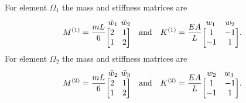 \documentclass{AeroStructure-ERJohnson}
\begin{document}
\begin{example*}
For element $\Omega_1$ the mass and stiffness matrices are
\begin{align}\label{ex18.2a}
M^{(1)}=\frac{m L}{6}
\begin{array}{@{}l@{}}
\hspace*{3pt}{\arraycolsep=2pt\begin{array}{@{}cc@{}}
\ddot{w}_{1} & \ddot{w}_{2}
\end{array}}\\
\left[\begin{array}{@{}ll@{}}2 & 1 \\1 & 2\end{array}\right]
\end{array}
\quad \text{and} \quad K^{(1)}=\frac{E A}{L}
\begin{array}{@{}l@{}}
\hspace*{5pt}{\arraycolsep=6pt\begin{array}{@{}cc@{}}
w_{1} & w_{2}
\end{array}}\\
\left[\begin{array}{@{}cc@{}}1 & -1 \\-1 & 1\end{array}\right]
\end{array}.
\end{align}
For element $\Omega_2$ the mass and stiffness matrices are
\begin{align}\label{ex18.2b}
M^{(2)}=\frac{m L}{6}
\begin{array}{@{}l@{}}
\hspace*{3pt}{\arraycolsep=2pt\begin{array}{@{}cc@{}}
\ddot{w}_{2} & \ddot{w}_{3}
\end{array}}\\
\left[\begin{array}{@{}ll@{}}2 & 1 \\1 & 2\end{array}\right]\end{array} \quad \text{and} \quad K^{(2)}=\frac{E A}{L}
\begin{array}{@{}l@{}}
\hspace*{6pt}{\arraycolsep=5pt\begin{array}{@{}cc@{}}
w_{2} & w_{3}
\end{array}}\\
\left[\begin{array}{@{}cc@{}}1 & -1 \\
-1 & 1\end{array}\right]
\end{array}.

\end{align}
\end{example*}
\end{document}
